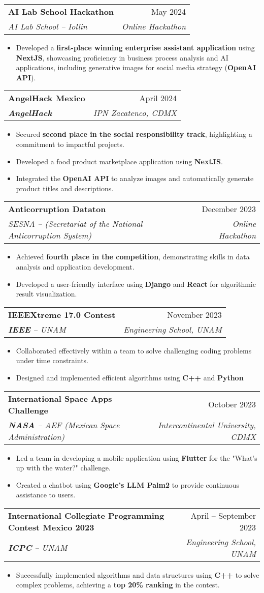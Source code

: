 \documentclass[letterpaper,11pt]{article}
\makeatletter
\newcommand{\resumeItem}[1]{
  \item\small{
    {#1 \vspace{-2pt}}
  }
}
\newcommand{\resumeSubheading}[4]{
  \vspace{-2pt}\item
    \begin{tabular*}{0.97\textwidth}[t]{l@{\extracolsep{\fill}}r}
      \textbf{#1} & #2 \\
      \textit{\small#3} & \textit{\small #4} \\
    \end{tabular*}\vspace{-7pt}
}
\newcommand{\resumeItemListStart}{\begin{itemize}}
\newcommand{\resumeItemListEnd}{\end{itemize}\vspace{-5pt}}
\makeatother
\begin{document}
\resumeSubheading
{AI Lab School Hackathon}{May 2024}
{AI Lab School -- Iollin}{Online Hackathon}
\resumeItemListStart
\resumeItem{Developed a {\textbf{first-place winning enterprise assistant application}} using {\textbf{NextJS}}, showcasing proficiency in business process analysis and AI applications, including generative images for social media strategy ({\textbf{OpenAI API}}).}
\resumeItemListEnd

\resumeSubheading
{AngelHack Mexico}{April 2024}
{{\textbf{AngelHack}}}{IPN Zacatenco, CDMX}
\resumeItemListStart
\resumeItem{Secured {\textbf{second place in the social responsibility track}}, highlighting a commitment to impactful projects.}
\resumeItem{Developed a food product marketplace application using {\textbf{NextJS}}.}
\resumeItem{Integrated the {\textbf{OpenAI API}} to analyze images and automatically generate product titles and descriptions.}
\resumeItemListEnd

\resumeSubheading
{Anticorruption Dataton}{December 2023}
{SESNA -- (Secretariat of the National Anticorruption System) }{Online Hackathon}
\resumeItemListStart
\resumeItem{Achieved {\textbf{fourth place in the competition}}, demonstrating skills in data analysis and application development.}
\resumeItem{Developed a user-friendly interface using {\textbf{Django}} and {\textbf{React}} for algorithmic result visualization.}
\resumeItemListEnd

\resumeSubheading
{IEEEXtreme 17.0 Contest}{November 2023}
{{\textbf{IEEE}} -- UNAM}{Engineering School, UNAM}
\resumeItemListStart
\resumeItem{Collaborated effectively within a team to solve challenging coding problems under time constraints.}
\resumeItem{Designed and implemented efficient algorithms using {\textbf{C++}} and {\textbf{Python}}}
\resumeItemListEnd

\resumeSubheading
{International Space Apps Challenge}{October 2023}
{{\textbf{NASA}} -- AEF (Mexican Space Administration)}{Intercontinental University, CDMX}
\resumeItemListStart
\resumeItem{Led a team in developing a mobile application using {\textbf{Flutter}} for the "What's up with the water?" challenge.}
\resumeItem{Created a chatbot using {\textbf{Google's LLM Palm2}} to provide continuous assistance to users.}
\resumeItemListEnd

\resumeSubheading{International Collegiate Programming Contest Mexico 2023}{April -- September 2023}{ {\textbf{ICPC}} -- UNAM}{Engineering School, UNAM}
\resumeItemListStart
\resumeItem{Successfully implemented algorithms and data structures using {\textbf{C++}} to solve complex problems, achieving a {\textbf{top 20\% ranking}} in the contest.}
\resumeItemListEnd
\end{document}
